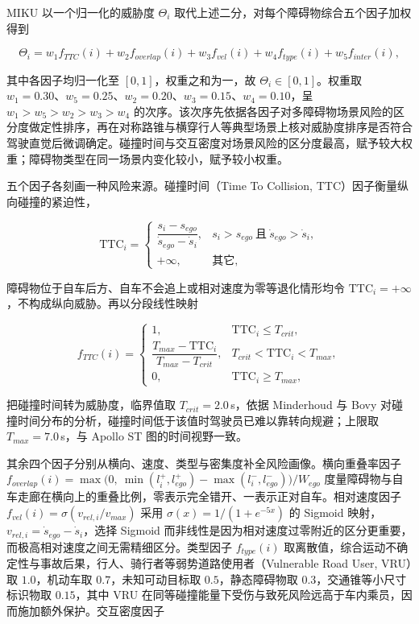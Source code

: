 \documentclass[a4paper,11pt]{ctexart}
\theoremstyle{definition}
\begin{document}
MIKU 以一个归一化的威胁度 $\Theta_i$ 取代上述二分，对每个障碍物综合五个因子加权得到

\begin{equation}
    \Theta_i = w_1 f_{TTC}(i) + w_2 f_{overlap}(i) + w_3 f_{vel}(i) + w_4 f_{type}(i) + w_5 f_{inter}(i),
    \label{eq:threat_score}
\end{equation}

其中各因子均归一化至 $[0,1]$，权重之和为一，故 $\Theta_i \in [0,1]$。权重取 $w_1=0.30$、$w_5=0.25$、$w_2=0.20$、$w_3=0.15$、$w_4=0.10$，呈 $w_1>w_5>w_2>w_3>w_4$ 的次序。该次序先依据各因子对多障碍物场景风险的区分度做定性排序，再在对称路锥与横穿行人等典型场景上核对威胁度排序是否符合驾驶直觉后微调确定。碰撞时间与交互密度对场景风险的区分度最高，赋予较大权重；障碍物类型在同一场景内变化较小，赋予较小权重。

五个因子各刻画一种风险来源。碰撞时间（Time To Collision, TTC）因子衡量纵向碰撞的紧迫性，

\begin{equation}
    \mathrm{TTC}_i =
    \begin{cases}
        \dfrac{s_i - s_{ego}}{\dot{s}_{ego} - \dot{s}_i}, & s_i > s_{ego} \ \text{且}\ \dot{s}_{ego} > \dot{s}_i, \\[0.6em]
        +\infty, & \text{其它},
    \end{cases}
    \label{eq:ttc}
\end{equation}

障碍物位于自车后方、自车不会追上或相对速度为零等退化情形均令 $\mathrm{TTC}_i=+\infty$，不构成纵向威胁。再以分段线性映射

\begin{equation}
    f_{TTC}(i) =
    \begin{cases}
        1, & \mathrm{TTC}_i \leq T_{crit}, \\[0.3em]
        \dfrac{T_{max} - \mathrm{TTC}_i}{T_{max} - T_{crit}}, & T_{crit} < \mathrm{TTC}_i < T_{max}, \\[0.6em]
        0, & \mathrm{TTC}_i \geq T_{max},
    \end{cases}
    \label{eq:f_ttc}
\end{equation}

把碰撞时间转为威胁度，临界值取 $T_{crit}=2.0$\,s，依据 Minderhoud 与 Bovy 对碰撞时间分布的分析，碰撞时间低于该值时驾驶员已难以靠转向规避；上限取 $T_{max}=7.0$\,s，与 Apollo ST 图的时间视野一致。

其余四个因子分别从横向、速度、类型与密集度补全风险画像。横向重叠率因子 $f_{overlap}(i)=\max\!\big(0,\ \min(l_i^{+}, l_{ego}^{+}) - \max(l_i^{-}, l_{ego}^{-})\big)/W_{ego}$ 度量障碍物与自车走廊在横向上的重叠比例，零表示完全错开、一表示正对自车。相对速度因子 $f_{vel}(i)=\sigma(v_{rel,i}/v_{max})$ 采用 $\sigma(x)=1/(1+e^{-5x})$ 的 Sigmoid 映射，$v_{rel,i}=\dot{s}_{ego}-\dot{s}_i$，选择 Sigmoid 而非线性是因为相对速度过零附近的区分更重要，而极高相对速度之间无需精细区分。类型因子 $f_{type}(i)$ 取离散值，综合运动不确定性与事故后果，行人、骑行者等弱势道路使用者（Vulnerable Road User, VRU）取 $1.0$，机动车取 $0.7$，未知可动目标取 $0.5$，静态障碍物取 $0.3$，交通锥等小尺寸标识物取 $0.15$，其中 VRU 在同等碰撞能量下受伤与致死风险远高于车内乘员，因而施加额外保护。交互密度因子
\end{document}
